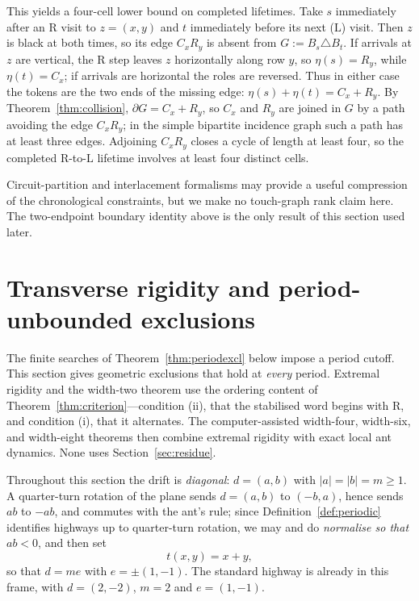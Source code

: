 \documentclass[11pt,letterpaper]{article}
\theoremstyle{plain}
\theoremstyle{definition}
\newcommand{\drift}{d}
\newcommand{\turnR}{\mathrm{R}}
\newcommand{\turnL}{\mathrm{L}}
\begin{document}
\begin{NoHyper}
This yields a four-cell lower bound on completed lifetimes. Take $s$ immediately after
an $\turnR$ visit to $z=(x,y)$ and $t$ immediately before its next ($\turnL$) visit.
Then $z$ is black at both times, so its edge $C_xR_y$ is absent from $G:=B_s\triangle
B_t$. If arrivals at $z$ are vertical, the $\turnR$ step leaves $z$ horizontally
along row $y$, so $\eta(s)=R_y$, while $\eta(t)=C_x$; if arrivals are horizontal the
roles are reversed. Thus in either case the tokens are the two ends of the missing
edge: $\eta(s)+\eta(t)=C_x+R_y$. By Theorem~\ref{thm:collision},
$\partial G=C_x+R_y$, so $C_x$ and $R_y$ are joined in $G$ by a path avoiding the edge
$C_xR_y$; in the simple bipartite incidence graph such a path has at least three edges.
Adjoining $C_xR_y$ closes a cycle of length at least four, so the completed
$\turnR$-to-$\turnL$ lifetime involves at least four distinct cells.

Circuit-partition and interlacement formalisms may provide a useful compression of
the chronological constraints, but we make no touch-graph rank claim here. The
two-endpoint boundary identity above is the only result of this section used later.

\section{Transverse rigidity and period-unbounded exclusions}\label{sec:transverse}

The finite searches of Theorem~\ref{thm:periodexcl} below impose a period
cutoff. This section gives geometric exclusions that hold at \emph{every}
period. Extremal rigidity and the width-two theorem use the ordering content of
Theorem~\ref{thm:criterion}---condition (ii), that the stabilised word begins with
$\turnR$, and condition (i), that it alternates.  The computer-assisted width-four,
width-six, and width-eight theorems then combine extremal rigidity with exact local ant dynamics.
None uses
Section~\ref{sec:residue}.

Throughout this section the drift is \emph{diagonal}: $\drift=(a,b)$ with
$|a|=|b|=m\ge1$. A quarter-turn rotation of the plane sends $\drift=(a,b)$ to
$(-b,a)$, hence sends $ab$ to $-ab$, and commutes with the ant's rule; since
Definition~\ref{def:periodic} identifies highways up to quarter-turn rotation, we may
and do \emph{normalise so that $ab<0$}, and then set
\begin{equation}\label{eq:tfun}
t(x,y)=x+y,
\end{equation}
so that $\drift=m e$ with $e=\pm(1,-1)$. The standard highway is already in this
frame, with $\drift=(2,-2)$, $m=2$ and $e=(1,-1)$.


\end{NoHyper}
\end{document}
